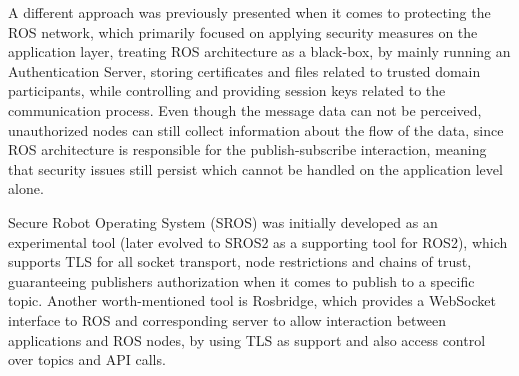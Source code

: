 A different approach was previously presented\cite{application-security-ros} when it comes to protecting the ROS network, which primarily focused on applying security measures on the application layer, treating ROS architecture as a black-box, by mainly running an Authentication Server, storing certificates and files related to trusted domain participants, while controlling and providing session keys related to the communication process. Even though the message data can not be perceived, unauthorized nodes can still collect information about the flow of the data, since ROS architecture is responsible for the publish-subscribe interaction, meaning that security issues still persist which cannot be handled on the application level alone.  

Secure Robot Operating System (SROS)\cite{white2016sros} was initially developed as an experimental tool (later evolved to SROS2 as a supporting tool for ROS2), which supports TLS for all socket transport, node restrictions and chains of trust, guaranteeing publishers authorization when it comes to publish to a specific topic. Another worth-mentioned tool is Rosbridge\cite{crick2017rosbridge}, which provides a WebSocket interface to ROS and corresponding server to allow interaction between applications and ROS nodes, by using TLS as support and also access control over topics and API calls. 